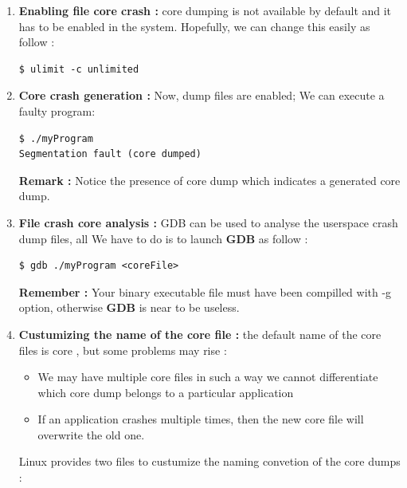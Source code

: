 \begin{enumerate}
	\item \textbf{Enabling file core crash : } core dumping is not available by default and it has to be enabled in the system. Hopefully, we can change this easily as follow :
	
\begin{lstlisting}[style=BashInputStyle]	
$ ulimit -c unlimited
\end{lstlisting}	


	\item \textbf{Core crash generation : } Now, dump files are enabled; We can execute a faulty program:
\begin{lstlisting}[style=BashInputStyle]	
$ ./myProgram
Segmentation fault (core dumped)	
\end{lstlisting}
\textbf{Remark : } Notice the presence of \og core dump \fg which indicates a generated core dump.	
	\item \textbf{File crash core analysis : } GDB can be used to analyse the userspace crash dump files, all We have to do is to launch \textbf{GDB} as follow : 
\begin{lstlisting}[style=BashInputStyle]	
$ gdb ./myProgram <coreFile>	
\end{lstlisting}	


\textbf{\color{orange}Remember :} Your binary executable file must have been compilled with -g option, otherwise \textbf{GDB} is near to be useless.

	\item \textbf{Custumizing the name of the core file : }
	the default name of the core files is \og core \fg, but some problems may rise :
		\begin{itemize}
			\item {We may have multiple core files in such a way we cannot differentiate which core dump belongs to a particular
application}
			\item {If an application crashes multiple times, then the new core file will overwrite the old one.}
		\end{itemize}
		
		Linux provides two files to custumize the naming convetion of the core dumps :
		

\end{enumerate}
